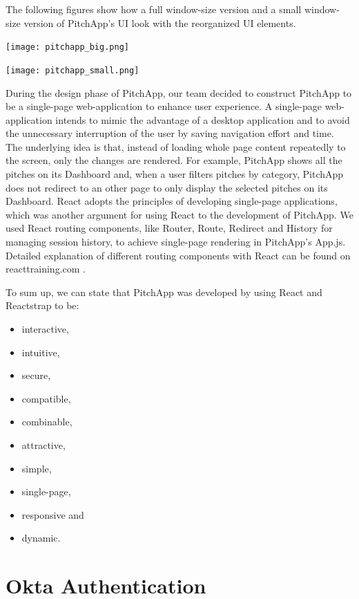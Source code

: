 The following figures show how a full window-size version and a small window-size version of PitchApp's UI look with the reorganized UI elements.

\begin{center}
	\texttt{[image: pitchapp\_big.png]}
\end{center} 

\begin{center}
	\texttt{[image: pitchapp\_small.png]}
\end{center} 

During the design phase of PitchApp, our team decided to construct PitchApp to be a single-page web-application to enhance user experience. A single-page web-application intends to mimic the advantage of a desktop application and to avoid the unnecessary interruption of the user by saving navigation effort and time. The underlying idea is that, instead of loading whole page content repeatedly to the screen, only the changes are rendered. For example, PitchApp shows all the pitches on its Dashboard and, when a user filters pitches by category, PitchApp does not redirect to an other page to only display the selected pitches on its Dashboard. React adopts the principles of developing single-page applications, which was another argument for using React to the development of PitchApp. We used React routing components, like Router, Route, Redirect and History for managing session history, to achieve single-page rendering in PitchApp's App.js. Detailed explanation of different routing components with React can be found on reacttraining.com \parencite{React_router}.

To sum up, we can state that PitchApp was developed by using React and Reactstrap to be:

\begin{itemize}
	\item interactive,
	\item intuitive,
	\item secure,
	\item compatible,
	\item combinable,
	\item attractive,
	\item simple,
	\item single-page,
	\item responsive and
	\item dynamic.
\end{itemize}

\section{Okta Authentication}

